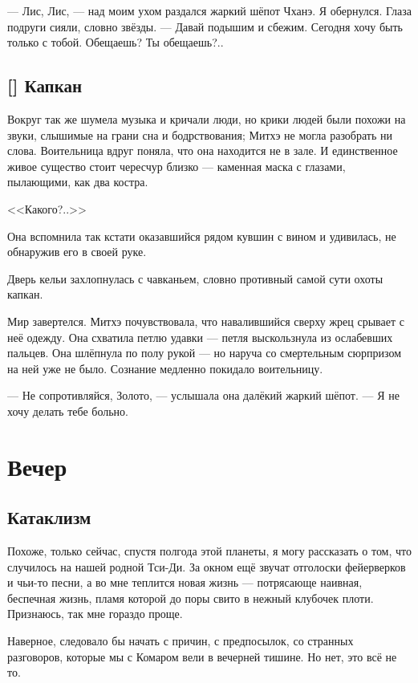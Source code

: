 --- Лис, Лис, --- над моим ухом раздался жаркий шёпот Чханэ.
Я обернулся.
Глаза подруги сияли, словно звёзды.
--- Давай подышим и сбежим.
Сегодня хочу быть только с тобой.
Обещаешь?
Ты обещаешь?..

\section{[] Капкан}

\textspace

Вокруг так же шумела музыка и кричали люди, но крики людей были похожи на звуки, слышимые на грани сна и бодрствования;
Митхэ не могла разобрать ни слова.
Воительница вдруг поняла, что она находится не в зале.
И единственное живое существо стоит чересчур близко --- каменная маска с глазами, пылающими, как два костра.

<<Какого?..>>

Она вспомнила так кстати оказавшийся рядом кувшин с вином и удивилась, не обнаружив его в своей руке.

Дверь кельи захлопнулась с чавканьем, словно противный самой сути охоты капкан.

Мир завертелся.
Митхэ почувствовала, что навалившийся сверху жрец срывает с неё одежду.
Она схватила петлю удавки --- петля выскользнула из ослабевших пальцев.
Она шлёпнула по полу рукой --- но наруча со смертельным сюрпризом на ней уже не было.
Сознание медленно покидало воительницу.

--- Не сопротивляйся, Золото, --- услышала она далёкий жаркий шёпот.
--- Я не хочу делать тебе больно.

\chapter{Вечер}

\section{Катаклизм}

Похоже, только сейчас, спустя полгода этой планеты, я могу рассказать о том, что случилось на нашей родной Тси-Ди.
За окном ещё звучат отголоски фейерверков и чьи-то песни, а во мне теплится новая жизнь --- потрясающе наивная, беспечная жизнь, пламя которой до поры свито в нежный клубочек плоти.
Признаюсь, так мне гораздо проще.

Наверное, следовало бы начать с причин, с предпосылок, со странных разговоров, которые мы с Комаром вели в вечерней тишине.
Но нет, это всё не то.

